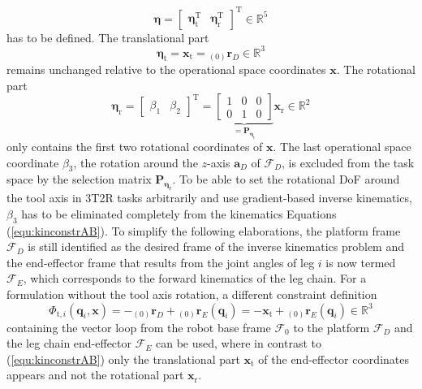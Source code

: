 \documentclass[robotics,article,accept,moreauthors,pdftex]{Definitions/mdpi}
\newcommand{\bm}[1]{\boldsymbol{#1}}
\newcommand{\ortvek}[4]{{ }_{(#1)}{\boldsymbol{#2}}^{#3}_{#4} }
\newcommand{\transp}[0]{{\mathrm{T}}}
\newcommand{\ks}[1]{{\mathcal{F}}_{#1}}
\let\Phi\varPhi
\begin{document}
\begin{equation}
\bm{\eta}
=
\begin{bmatrix}
\bm{\eta}_{\mathrm{t}}^\transp & 
\bm{\eta}_{\mathrm{r}}^\transp
\end{bmatrix}^\transp
\in {\mathbb{R}}^{5}
\end{equation}
%
has to be defined.
%
The translational part
%
\begin{equation}
\bm{\eta}_{\mathrm{t}}
=
\bm{x}_{\mathrm{t}}
=
\ortvek{0}{r}{}{D}
\in {\mathbb{R}}^{3}
\end{equation}
%
remains unchanged relative to the operational space coordinates $\bm{x}$.
The rotational part
%
\begin{equation}
\bm{\eta}_{\mathrm{r}}
=
\begin{bmatrix}
\beta_1 & \beta_2
\end{bmatrix}^\transp
=
\underbrace{\begin{bmatrix}
    1 & 0 & 0 \\ 
    0 & 1 & 0 \end{bmatrix}}_{=\bm{P}_{\bm{\eta}_\mathrm{r}}}
\bm{x}_{\mathrm{r}}
\in {\mathbb{R}}^{2}
\label{equ:etar_def}
\end{equation}
%
only contains the first two rotational coordinates of $\bm{x}$.
The last operational space coordinate $\beta_3$, the rotation around the $z$-axis $\bm{a}_{D}$ of $\ks{D}$, is excluded from the task space by the selection matrix $\bm{P}_{\bm{\eta}_\mathrm{r}}$.
To be able to set the rotational DoF around the tool axis in 3T2R tasks arbitrarily and use gradient-based inverse kinematics, $\beta_3$ has to be eliminated completely from the kinematics Equations (\ref{equ:kinconstrAB}).
%
%
To simplify the following elaborations, the platform frame $\ks{D}$ is still identified as the desired frame of the inverse kinematics problem and the end-effector frame that results from the joint angles of leg $i$ is now termed $\ks{E}$, which corresponds to the forward kinematics of the leg chain.
%
For a formulation without the tool axis rotation, a different constraint definition
%
\begin{equation}
\bm{\Phi}_{\mathrm{t},i}(\bm{q}_i,\bm{x})
= 
- \ortvek{0}{r}{}{D} + \ortvek{0}{r}{}{E}(\bm{q}_i)
=
- \bm{x}_{\mathrm{t}} + \ortvek{0}{r}{}{E}(\bm{q}_i) \in {\mathbb{R}}^{3}
\label{equ:Phit_def_i}
\end{equation}
%
containing the vector loop from the robot base frame $\ks{0}$ to the platform $\ks{D}$ and the leg chain end-effector $\ks{E}$ can be used, where in contrast to (\ref{equ:kinconstrAB}) only the translational part $\bm{x}_{\mathrm{t}}$ of the end-effector coordinates appears and not the rotational part $\bm{x}_{\mathrm{r}}$.
\end{document}

